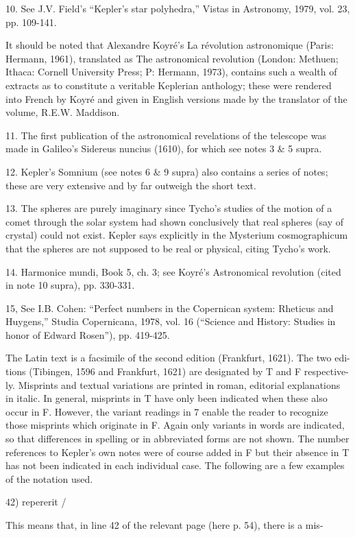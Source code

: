 \documentclass{article}
\begin{document}
10. See J.V. Field’s “Kepler’s star polyhedra,” Vistas in Astronomy, 1979, vol.
23, pp. 109-141.

It should be noted that Alexandre Koyré’s La révolution astronomique (Paris:
Hermann, 1961), translated as The astronomical revolution (London: Methuen;
Ithaca: Cornell University Press; P: Hermann, 1973), contains such a wealth of
extracts as to constitute a veritable Keplerian anthology; these were rendered into
French by Koyré and given in English versions made by the translator of the
volume, R.E.W. Maddison.

11. The first publication of the astronomical revelations of the telescope was
made in Galileo’s Sidereus nuncius (1610), for which see notes 3 & 5 supra.

12. Kepler’s Somnium (see notes 6 & 9 supra) also contains a series of notes; these
are very extensive and by far outweigh the short text.

13. The spheres are purely imaginary since Tycho’s studies of the motion of a
comet through the solar system had shown conclusively that real spheres (say of
crystal) could not exist. Kepler says explicitly in the Mysterium cosmographicum
that the spheres are not supposed to be real or physical, citing Tycho’s work.

14. Harmonice mundi, Book 5, ch. 3; see Koyré’s Astronomical revolution (cited
in note 10 supra), pp. 330-331.

15, See I.B. Cohen: “Perfect numbers in the Copernican system: Rheticus and
Huygens,” Studia Copernicana, 1978, vol. 16 (“Science and History: Studies in
honor of Edward Rosen”), pp. 419-425.


The Latin text is a facsimile of the second edition (Frankfurt, 1621). The two edi-
tions (Tibingen, 1596 and Frankfurt, 1621) are designated by T and F respective-
ly. Misprints and textual variations are printed in roman, editorial explanations in
italic. In general, misprints in T have only been indicated when these also occur in
F. However, the variant readings in 7 enable the reader to recognize those
misprints which originate in F. Again only variants in words are indicated, so that
differences in spelling or in abbreviated forms are not shown. The number
references to Kepler’s own notes were of course added in F but their absence in T
has not been indicated in each individual case.
The following are a few examples of the notation used.

42) repererit /

This means that, in line 42 of the relevant page (here p. 54), there is a mis-
\end{document}
